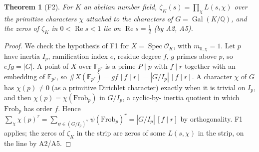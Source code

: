 \documentclass[11pt]{article}
\newtheorem{theorem}{Theorem}\newtheorem{lemma}[theorem]{Lemma}\newtheorem{corollary}[theorem]{Corollary}
\theoremstyle{definition}\newtheorem{definition}[theorem]{Definition}\newtheorem{remark}[theorem]{Remark}
\begin{document}
\begin{theorem}[F2]\label{F2} For $K$ an abelian number field, $\zeta_K(s)=\prod_{\chi}L(s,\chi)$ over the primitive characters
$\chi$ attached to the characters of $G=\operatorname{Gal}(K/\mathbb Q)$, and the zeros of $\zeta_K$ in $0<\operatorname{Re}s<1$
lie on $\operatorname{Re}s=\tfrac12$ (by A2, A5).\end{theorem}
\begin{proof} We check the hypothesis of F1 for $X=\operatorname{Spec}\mathcal O_K$, with $m_{0,\chi}=1$. Let $p$ have
inertia $I_p$, ramification index $e$, residue degree $f$, $g$ primes above $p$, so $efg=|G|$. A point of $X$ over
$\mathbb F_{p^r}$ is a prime $P\mid p$ with $f\mid r$ together with an embedding of $\mathbb F_{p^f}$, so
$\#X(\mathbb F_{p^r})=gf\,[f\mid r]=|G/I_p|\,[f\mid r]$. A character $\chi$ of $G$ has $\chi(p)\neq0$ (as a primitive
Dirichlet character) exactly when it is trivial on $I_p$, and then $\chi(p)=\chi(\mathrm{Frob}_p)$ in $G/I_p$, a cyclic-by-
inertia quotient in which $\mathrm{Frob}_p$ has order $f$. Hence $\sum_\chi\chi(p)^r=\sum_{\psi\in(G/I_p)^\vee}\psi(\mathrm{Frob}_p)^r
=|G/I_p|\,[f\mid r]$ by orthogonality. F1 applies; the zeros of $\zeta_K$ in the strip are zeros of some $L(s,\chi)$ in the
strip, on the line by A2/A5.\end{proof}
\end{document}
